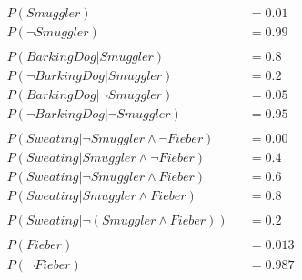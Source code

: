 \documentclass[ngerman]{fbi-aufgabenblatt}
\begin{document}


\begin{align*}
&P(Smuggler) &&= 0.01\\
&P(\neg Smuggler) &&= 0.99\\
&\\
&P(BarkingDog | Smuggler) &&= 0.8\\
&P(\neg BarkingDog | Smuggler) &&= 0.2\\
&P(BarkingDog | \neg Smuggler) &&= 0.05\\
&P(\neg BarkingDog | \neg Smuggler) &&= 0.95\\
&\\
&P(Sweating | \neg Smuggler \land  \neg Fieber) &&= 0.00\\
&P(Sweating |  Smuggler \land \neg Fieber) &&= 0.4\\
&P(Sweating |  \neg Smuggler \land Fieber) &&= 0.6\\
&P(Sweating |  Smuggler \land Fieber) &&= 0.8\\
&\\
&P(Sweating |  \neg(Smuggler \land Fieber)) &&= 0.2\\
&\\
&P(Fieber) &&= 0.013\\
&P(\neg Fieber) &&= 0.987\\
\end{align*}
\end{document}
